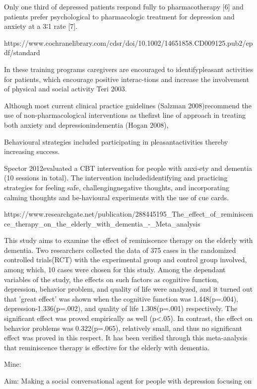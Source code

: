 Only one third of depressed patients respond fully to pharmacotherapy [6] and patients prefer psychological to pharmacologic treatment for depression and anxiety at a 3∶1 rate [7].


https://www.cochranelibrary.com/cdsr/doi/10.1002/14651858.CD009125.pub2/epdf/standard

In these training programs caregivers are encouraged to identifypleasant activities for patients, which encourage positive interac-tions and increase the involvement of physical and social activity Teri 2003.

Although most current clinical practice guidelines (Salzman 2008)recommend the use of non-pharmacological interventions as thefirst line of approach in treating both anxiety and depressionindementia (Hogan 2008), 

Behavioural strategies included participating in pleasantactivities thereby increasing success.

Spector 2012evaluated a CBT intervention for people with anxi-ety and dementia (10 sessions in total). The intervention includedidentifying and practicing strategies for feeling safe, challengingnegative thoughts, and incorporating calming thoughts and be-havioural experiments with the use of cue cards.


https://www.researchgate.net/publication/288445195_The_effect_of_reminiscence_therapy_on_the_elderly_with_dementia_-_Meta_analysis

This study aims to examine the effect of reminiscence therapy on the elderly with dementia. Two researchers collected the data of 375 cases in the randomized controlled trials(RCT) with the experimental group and control group involved, among which, 10 cases were chosen for this study. Among the dependant variables of the study, the effects on such factors as cognitive function, depression, behavior problem, and quality of life were analyzed, and it turned out that 'great effect' was shown when the cognitive function was 1.448(p=.004), depression-1.336(p=.002), and quality of life 1.308(p=.001) respectively. The significant effect was proved empirically as well (p<.05). In contrast, the effect on behavior problems was 0.322(p=.065), relatively small, and thus no significant effect was proved in this respect. It has been verified through this meta-analysis that reminiscence therapy is effective for the elderly with dementia.



Mine:

Aim: Making a social conversational agent for people with depression focusing on 


